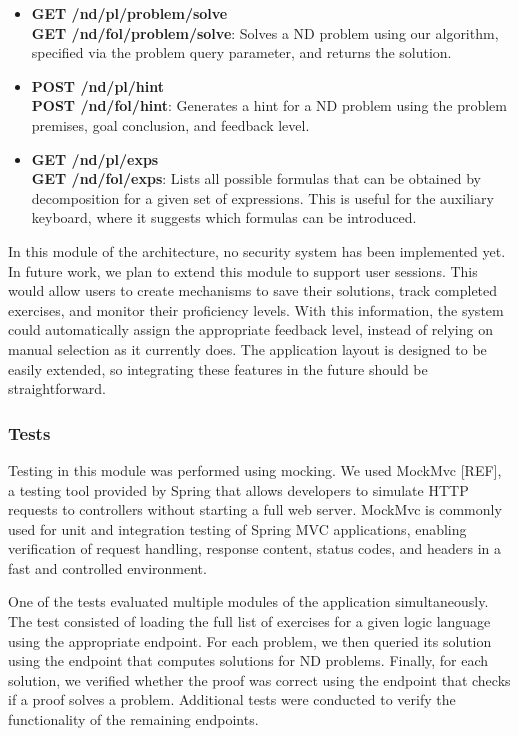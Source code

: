 \begin{itemize}[label={}]
\begin{itemize}[noitemsep, topsep=0pt]
        \item \textbf{GET /nd/pl/problem/solve}\\
        \textbf{GET /nd/fol/problem/solve}: Solves a \gls{ND} problem using our algorithm, specified via the problem query parameter, and returns the solution.

        \item \textbf{POST /nd/pl/hint}\\
        \textbf{POST /nd/fol/hint}: Generates a hint for a \gls{ND} problem using the problem premises, goal conclusion, and feedback level.

        \item \textbf{GET /nd/pl/exps}\\
        \textbf{GET /nd/fol/exps}: Lists all possible formulas that can be obtained by decomposition for a given set of expressions. This is useful for the auxiliary keyboard, where it suggests which formulas can be introduced.

    \end{itemize}
\end{itemize}

In this module of the architecture, no security system has been implemented yet. In future work, we plan to extend this module to support user sessions. This would allow users to create mechanisms to save their solutions, track completed exercises, and monitor their proficiency levels. With this information, the system could automatically assign the appropriate feedback level, instead of relying on manual selection as it currently does. The application layout is designed to be easily extended, so integrating these features in the future should be straightforward.

\subsubsection{Tests}
Testing in this module was performed using mocking. We used MockMvc [REF], a testing tool provided by Spring that allows developers to simulate HTTP requests to controllers without starting a full web server. MockMvc is commonly used for unit and integration testing of Spring MVC applications, enabling verification of request handling, response content, status codes, and headers in a fast and controlled environment. 

One of the tests evaluated multiple modules of the application simultaneously. The test consisted of loading the full list of exercises for a given logic language using the appropriate endpoint. For each problem, we then queried its solution using the endpoint that computes solutions for \gls{ND} problems. Finally, for each solution, we verified whether the proof was correct using the endpoint that checks if a proof solves a problem. Additional tests were conducted to verify the functionality of the remaining endpoints.


